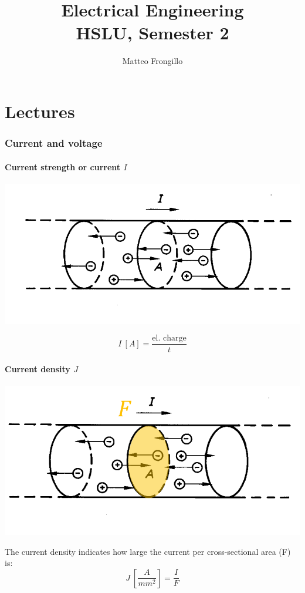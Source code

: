 \documentclass{article}
\title{\textbf{Electrical Engineering \\ HSLU, Semester 2}}
\author{Matteo Frongillo}
\date{}
\begin{document}
\maketitle
\tableofcontents
\pagebreak

\part{Lectures}
\section{Current and voltage}
\subsection{Current strength or current $I$}
\begin{center}
    \includegraphics[width=.4\textwidth]{media/intensity.png}
\end{center}
\[I\ [A] =\dfrac{\text{el. charge}}{t}\]

\subsection{Current density $J$}
\begin{center}
    \includegraphics[width=.4\textwidth]{media/density.png}
\end{center}
The current density indicates how large the current per cross-sectional area (F) is:
\[J\ [\dfrac{A}{mm^2}] = \dfrac{I}{F}\]
\end{document}
